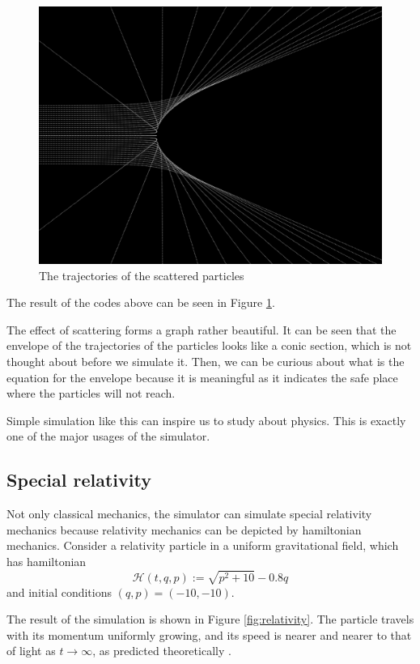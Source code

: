 \documentclass[12pt]{article}
\begin{document}
\begin{figure}[h]
  \centering
  \includegraphics[width=0.8\linewidth]{scatter.png}
  \caption{The trajectories of the scattered particles}
  \label{fig:scatter}
\end{figure}

The result of the codes above can be seen in Figure \ref{fig:scatter}.

The effect of scattering forms a graph rather beautiful.
It can be seen that the envelope of the trajectories of the particles
looks like a conic section, which is not thought about before we simulate it.
Then, we can be curious about what is the equation for the envelope
because it is meaningful as it indicates the safe place
where the particles will not reach.

Simple simulation like this can inspire us to study about physics.
This is exactly one of the major usages of the simulator.

\subsection{Special relativity}

Not only classical mechanics, the simulator can simulate special relativity mechanics
because relativity mechanics can be depicted by hamiltonian mechanics.
Consider a relativity particle in a uniform gravitational field, which has hamiltonian \cite[p. 28]{landau2010fields}
\begin{equation*}
  \mathcal H\left(t,q,p\right):=\sqrt{p^2+10}-0.8q
\end{equation*}
and initial conditions $\left(q,p\right)=\left(-10,-10\right)$.

The result of the simulation is shown in Figure \ref{fig:relativity}.
The particle travels with its momentum uniformly growing,
and its speed is nearer and nearer to that of light as $t\rightarrow\infty$,
as predicted theoretically \cite[p. 24]{landau2010fields}.
\end{document}

